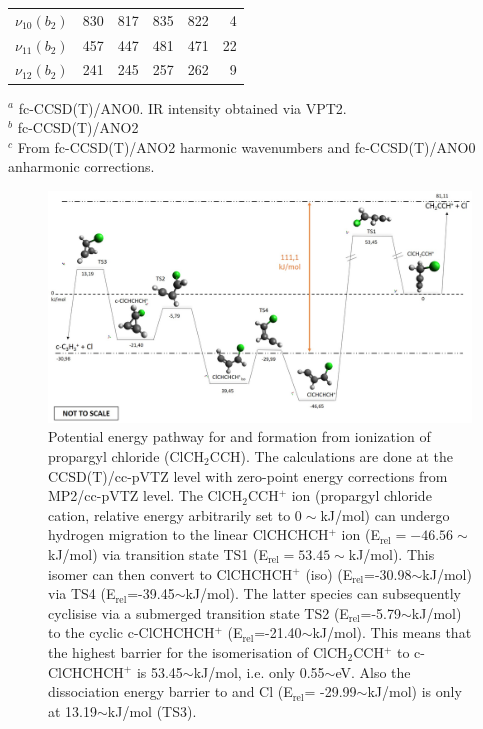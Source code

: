 \begin{table}[ht]
\begin{center}
\begin{tabular}{rrrrrr}
        $\nu_{10}(b_2)$&  830 &  817 &  835 &  822 &   4  \\ %
        $\nu_{11}(b_2)$&  457 &  447 &  481 &  471 &  22  \\ %
        $\nu_{12}(b_2)$&  241 &  245 &  257 &  262 &   9  \\ %
        \bottomrule
        \hline
    \end{tabular}
    \end{center}
    $^a$ fc-CCSD(T)/ANO0. IR intensity obtained via VPT2.\\
    $^b$ fc-CCSD(T)/ANO2\\
    $^c$ From fc-CCSD(T)/ANO2 harmonic wavenumbers and fc-CCSD(T)/ANO0 anharmonic corrections.

\end{table}

\begin{figure}[!ht]
	
	\centering
	\includegraphics[width=1\textwidth]{chapters/C3H3+ and C3D3+/figures/energy_calculation.jpg}

	\caption{
        Potential energy pathway for \cyc and \lin formation from ionization of propargyl chloride (ClCH$_2$CCH). 
        The calculations are done at the CCSD(T)/cc-pVTZ level with zero-point energy corrections from MP2/cc-pVTZ level.
        The ClCH$_2$CCH$^+$ ion (propargyl chloride cation, 
        relative energy arbitrarily set  to $0\sim$kJ/mol) can undergo hydrogen migration to the linear 
        ClCHCHCH$^+$ ion (E$_ \text{rel}=-46.56\sim$kJ/mol) 
        via transition state TS1 (E$_\text{rel}=53.45\sim$kJ/mol).
        This isomer can then convert to ClCHCHCH$^+$ (iso) (E$_\text{rel}$=-30.98$\sim$kJ/mol) via TS4 (E$_\text{rel}$=-39.45$\sim$kJ/mol). 
        The latter species can subsequently cyclisise via a submerged transition state TS2 (E$_\text{rel}$=-5.79$\sim$kJ/mol) to the cyclic c-ClCHCHCH$^+$ (E$_\text{rel}$=-21.40$\sim$kJ/mol).
        This means that the highest barrier for the isomerisation of ClCH$_2$CCH$^+$ to c-ClCHCHCH$^+$ is 53.45$\sim$kJ/mol, i.e. only 0.55$\sim$eV. 
        Also the dissociation energy barrier to \cyc and Cl (E$_\text{rel}$= -29.99$\sim$kJ/mol) is only at 13.19$\sim$kJ/mol (TS3).
    }\label{fig:C3H3+:fig1}
	\label{FIG:energy_comparison}
\end{figure}
